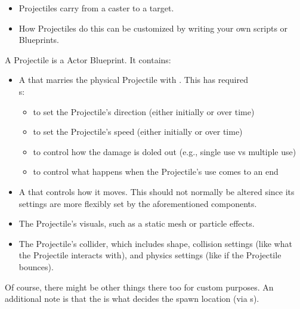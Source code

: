 

\begin{tldr}
	\begin{itemize}
		\item{Projectiles carry  from a caster to a target.}
		\item{How Projectiles do this can be customized by writing your own scripts or Blueprints.}
	\end{itemize}
\end{tldr}

\localtoc



A Projectile is a Actor Blueprint. It contains:
\begin{itemize}
	\item{A  that marries the physical Projectile with . This has required\\s:
		\begin{itemize}
			\item{ to set the Projectile's direction (either initially or over time)}
			\item{ to set the Projectile's speed (either initially or over time)}
			\item{ to control how the damage is doled out (e.g., single use vs multiple use)}
			\item{ to control what happens when the Projectile's use comes to an end}
		\end{itemize}
	}
	\item{A  that controls how it moves. This should not normally be altered since its settings are more flexibly set by the aforementioned components.}
	\item{The Projectile's visuals, such as a static mesh or particle effects.}
	\item{The Projectile's collider, which includes shape, collision settings (like what the Projectile interacts with), and physics settings (like if the Projectile bounces).}
\end{itemize}
\noindent Of course, there might be other things there too for custom purposes. An additional note is that the  is what decides the spawn location (via s).\\

